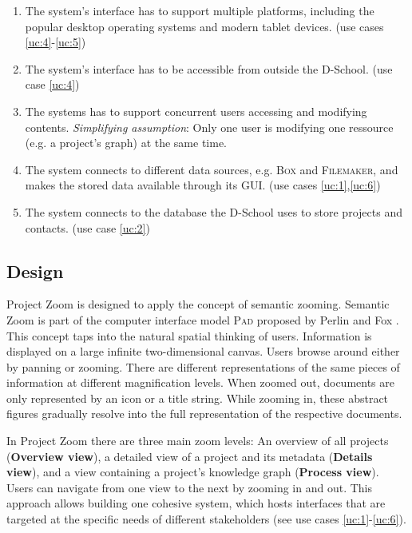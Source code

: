 \begin{enumerate}
\item The system's interface has to support multiple platforms, including the popular desktop operating systems and modern tablet devices. (use cases \ref{uc:4}-\ref{uc:5}) \label{req:1}
\item The system's interface has to be accessible from outside the D-School. (use case \ref{uc:4}) \label{req:2}
\item The systems has to support concurrent users accessing and modifying contents. \textit{Simplifying assumption}: Only one user is modifying one ressource (e.g. a project's graph) at the same time. \label{req:3}
\item The system connects to different data sources, e.g. \textsc{Box} and \textsc{Filemaker}, and makes the stored data available through its GUI. (use cases \ref{uc:1},\ref{uc:6}) \label{req:4}
\item The system connects to the database the D-School uses to store projects and contacts. (use case \ref{uc:2}) \label{req:4}

\end{enumerate}

\subsection{Design}
\label{sec:design}

Project Zoom is designed to apply the concept of semantic zooming. Semantic Zoom is part of the computer interface model \textsc{Pad} proposed by Perlin and Fox \cite{Perlin_1993}. This concept taps into the natural spatial thinking of users. Information is displayed on a large infinite two-dimensional canvas. Users browse around either by panning or zooming. There are different representations of the same pieces of information at different magnification levels. When zoomed out, documents are only represented by an icon or a title string. While zooming in, these abstract figures gradually resolve into the full representation of the respective documents. 

In Project Zoom there are three main zoom levels: An overview of all projects (\textbf{Overview view}), a detailed view of a project and its metadata (\textbf{Details view}), and a view containing a project's knowledge graph (\textbf{Process view}). Users can navigate from one view to the next by zooming in and out. This approach allows building one cohesive system, which hosts interfaces that are targeted at the specific needs of different stakeholders (see use cases \ref{uc:1}-\ref{uc:6}). 

